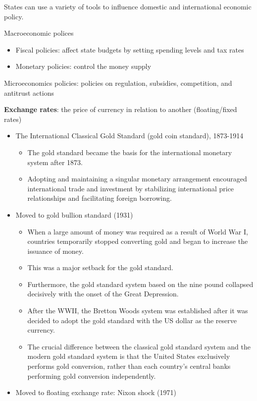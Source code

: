 \documentclass[
]{book}
\begin{document}
States can use a variety of tools to influence domestic and international economic policy.

Macroeconomic polices

\begin{itemize}
\item
  Fiscal policies: affect state budgets by setting spending levels and tax rates
\item
  Monetary policies: control the money supply
\end{itemize}

Microeconomics policies: policies on regulation, subsidies, competition, and antitrust actions

\textbf{Exchange rates}: the price of currency in relation to another (floating/fixed rates)

\begin{itemize}
\item
  The International Classical Gold Standard (gold coin standard), 1873-1914

  \begin{itemize}
  \item
    The gold standard became the basis for the international monetary system after 1873.
  \item
    Adopting and maintaining a singular monetary arrangement encouraged international trade and investment by stabilizing international price relationships and facilitating foreign borrowing.
  \end{itemize}
\item
  Moved to gold bullion standard (1931)

  \begin{itemize}
  \item
    When a large amount of money was required as a result of World War I, countries temporarily stopped converting gold and began to increase the issuance of money.
  \item
    This was a major setback for the gold standard.
  \item
    Furthermore, the gold standard system based on the nine pound collapsed decisively with the onset of the Great Depression.
  \item
    After the WWII, the Bretton Woods system was established after it was decided to adopt the gold standard with the US dollar as the reserve currency.
  \item
    The crucial difference between the classical gold standard system and the modern gold standard system is that the United States exclusively performs gold conversion, rather than each country's central banks performing gold conversion independently.
  \end{itemize}
\item
  Moved to floating exchange rate: Nixon shock (1971)


\end{itemize}
\end{document}
